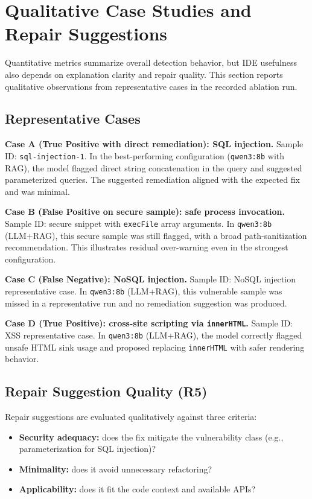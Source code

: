 \section{Qualitative Case Studies and Repair Suggestions}
\label{sec:eval-case-studies}

Quantitative metrics summarize overall detection behavior, but IDE usefulness also depends on explanation clarity and repair quality. This section reports qualitative observations from representative cases in the recorded ablation run.

\subsection*{Representative Cases}

\textbf{Case A (True Positive with direct remediation): SQL injection.}
Sample ID: \texttt{sql-injection-1}.
In the best-performing configuration (\texttt{qwen3:8b} with RAG), the model flagged direct string concatenation in the query and suggested parameterized queries. The suggested remediation aligned with the expected fix and was minimal.

\textbf{Case B (False Positive on secure sample): safe process invocation.}
Sample ID: secure snippet with \texttt{execFile} array arguments.
In \texttt{qwen3:8b} (LLM+RAG), this secure sample was still flagged, with a broad path-sanitization recommendation. This illustrates residual over-warning even in the strongest configuration.

\textbf{Case C (False Negative): NoSQL injection.}
Sample ID: NoSQL injection representative case.
In \texttt{qwen3:8b} (LLM+RAG), this vulnerable sample was missed in a representative run and no remediation suggestion was produced.

\textbf{Case D (True Positive): cross-site scripting via \texttt{innerHTML}.}
Sample ID: XSS representative case.
In \texttt{qwen3:8b} (LLM+RAG), the model correctly flagged unsafe HTML sink usage and proposed replacing \texttt{innerHTML} with safer rendering behavior.

\subsection*{Repair Suggestion Quality (R5)}

Repair suggestions are evaluated qualitatively against three criteria:
\begin{itemize}
  \item \textbf{Security adequacy:} does the fix mitigate the vulnerability class (e.g., parameterization for SQL injection)?
  \item \textbf{Minimality:} does it avoid unnecessary refactoring?
  \item \textbf{Applicability:} does it fit the code context and available APIs?
\end{itemize}

